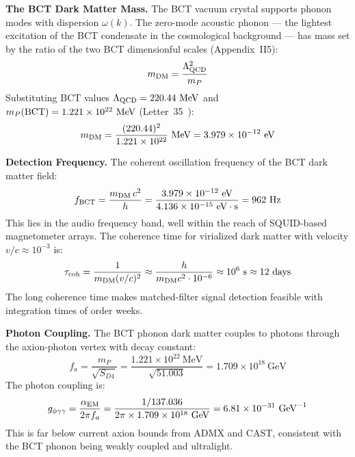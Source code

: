 \documentclass[aps,prl,twocolumn,superscriptaddress,floatfix]{revtex4-2}
\begin{document}
\medskip
\noindent\textbf{The BCT Dark Matter Mass.}
The BCT vacuum crystal supports phonon modes with dispersion $\omega(k)$.
The zero-mode acoustic phonon --- the lightest excitation of the BCT condensate
in the cosmological background --- has mass set by the ratio of the two
BCT dimensionful scales (Appendix~II5):
\begin{equation}
  m_{\rm DM} = \frac{\Lambda_{\rm QCD}^2}{m_P}
  \label{eq:mDM}
\end{equation}
Substituting BCT values $\Lambda_{\rm QCD} = 220.44\ \mathrm{MeV}$ and
$m_P({\rm BCT}) = 1.221\times10^{22}\ \mathrm{MeV}$ (Letter~35~\cite{L35}):
\begin{equation}
  m_{\rm DM} = \frac{(220.44)^2}{1.221\times10^{22}}\ \mathrm{MeV}
  = 3.979\times10^{-12}\ \mathrm{eV}
  \label{eq:mDMnum}
\end{equation}

\medskip
\noindent\textbf{Detection Frequency.}
The coherent oscillation frequency of the BCT dark matter field:
\begin{equation}
  f_{\rm BCT} = \frac{m_{\rm DM}\,c^2}{h}
  = \frac{3.979\times10^{-12}\ \mathrm{eV}}{4.136\times10^{-15}\ \mathrm{eV\cdot s}}
  = 962\ \mathrm{Hz}
  \label{eq:fBCT}
\end{equation}
This lies in the audio frequency band, well within the reach of SQUID-based
magnetometer arrays. The coherence time for virialized dark matter
with velocity $v/c \approx 10^{-3}$ is:
\begin{equation}
  \tau_{\rm coh} = \frac{1}{m_{\rm DM}(v/c)^2}
  \approx \frac{h}{m_{\rm DM} c^2 \cdot 10^{-6}}
  \approx 10^6\ \mathrm{s} \approx 12\ \mathrm{days}
  \label{eq:tcoh}
\end{equation}
The long coherence time makes matched-filter signal detection feasible
with integration times of order weeks.

\medskip
\noindent\textbf{Photon Coupling.}
The BCT phonon dark matter couples to photons through the axion-photon
vertex with decay constant:
\begin{equation}
  f_a = \frac{m_P}{\sqrt{S_{D4}}}
  = \frac{1.221\times10^{22}\ \mathrm{MeV}}{\sqrt{51.003}}
  = 1.709\times10^{18}\ \mathrm{GeV}
  \label{eq:fa}
\end{equation}
The photon coupling is:
\begin{equation}
  g_{\phi\gamma\gamma} = \frac{\alpha_{\rm EM}}{2\pi f_a}
  = \frac{1/137.036}{2\pi \times 1.709\times10^{18}\ \mathrm{GeV}}
  = 6.81\times10^{-31}\ \mathrm{GeV}^{-1}
  \label{eq:gcoupling}
\end{equation}
This is far below current axion bounds from ADMX and CAST,
consistent with the BCT phonon being weakly coupled and ultralight.
\end{document}
